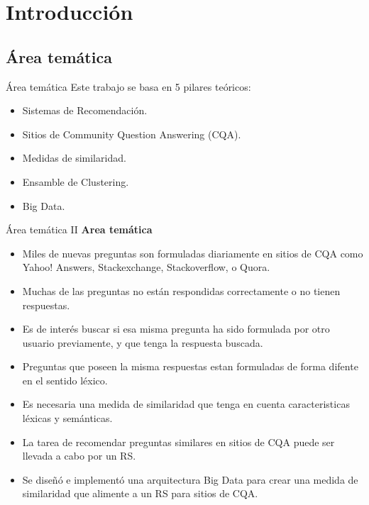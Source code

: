 \section{Introducción}

\subsection{Área temática}
\begin{frame}{Área temática}
	Este trabajo se basa en 5 pilares teóricos:
	\medskip
	\begin{itemize}[<*>]
		\item Sistemas de Recomendación.
		\item Sitios de Community Question Answering (CQA).
		\item Medidas de similaridad.
		\item Ensamble de Clustering.
		\item Big Data.
	\end{itemize}
\end{frame}

\begin{frame}{Área temática II}
	\textbf{Area temática}
	\medskip
	\begin{itemize}
		\item Miles de nuevas preguntas son formuladas diariamente en sitios de CQA como Yahoo! Answers, Stackexchange, Stackoverflow, o Quora.
		\item Muchas de las preguntas no están respondidas correctamente o no tienen respuestas.
		\item Es de interés buscar si esa misma pregunta ha sido formulada por otro usuario previamente, y que tenga la respuesta buscada.
		\item Preguntas que poseen la misma respuestas estan formuladas de forma difente en el sentido léxico.
		\item Es necesaria una medida de similaridad que tenga en cuenta caracteristicas léxicas y semánticas.
		\item La tarea de recomendar preguntas similares en sitios de CQA puede ser llevada a cabo por un RS.
		\item Se diseñó e implementó una arquitectura Big Data para crear una medida de similaridad que alimente a un RS para sitios de CQA.	\end{itemize}
\end{frame}


